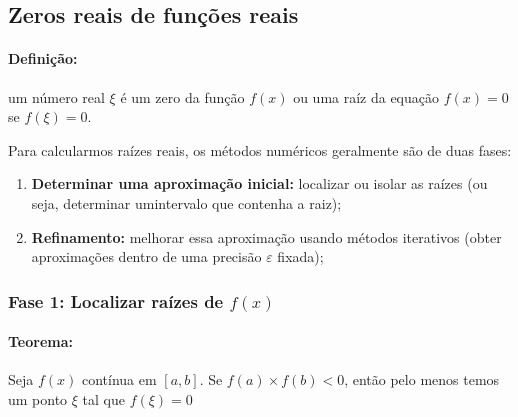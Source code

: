 \documentclass{article}
\begin{document}
            \newpage

    \subsection{Zeros reais de funções reais}
        \paragraph{Definição:} um número real $\xi$ é um zero da função $f(x)$ ou uma raíz da equação $f(x)=0$ se $f(\xi)=0$.


        Para calcularmos raízes reais, os métodos numéricos geralmente são de duas fases:

        \begin{enumerate}
            \item \textbf{Determinar uma aproximação inicial:} localizar ou isolar as raízes (ou seja, determinar umintervalo que contenha a raiz);
            \item \textbf{Refinamento:} melhorar essa aproximação usando métodos iterativos (obter aproximações dentro de uma precisão $\varepsilon$ fixada);
        \end{enumerate}

        \subsubsection{Fase 1: Localizar raízes de $f(x)$}
        \paragraph{Teorema:} Seja $f(x)$ contínua em $[a,b]$. Se $f(a) \times f(b) < 0$, então pelo menos temos um ponto $\xi$ tal que $f(\xi) = 0$
\end{document}
